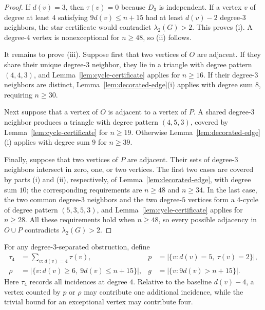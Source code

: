 \documentclass[11pt]{article}
\numberwithin{equation}{section}
\theoremstyle{definition}
\theoremstyle{remark}
\newcommand{\ac}{\lambda_2}
\begin{document}
\begin{proof}
If \(d(v)=3\), then \(\tau(v)=0\) because \(D_3\) is independent.  If a
vertex \(v\) of degree at least \(4\) satisfying \(9d(v)\le n+15\) had
at least \(d(v)-2\) degree-\(3\) neighbors, the star certificate would
contradict \(\ac(G)>2\).  This proves (i).  A degree-\(4\) vertex is
nonexceptional for \(n\ge48\), so (ii) follows.

It remains to prove (iii).  Suppose first that two vertices of \(O\) are
adjacent.  If they share their unique degree-\(3\) neighbor, they lie in a
triangle with degree pattern \((4,4,3)\), and
Lemma~\ref{lem:cycle-certificate} applies for \(n\ge16\).  If their degree-\(3\)
neighbors are distinct, Lemma~\ref{lem:decorated-edge}(i) applies with
degree sum \(8\), requiring \(n\ge30\).

Next suppose that a vertex of \(O\) is adjacent to a vertex of \(P\).
A shared degree-\(3\) neighbor produces a triangle with degree pattern
\((4,5,3)\), covered by Lemma~\ref{lem:cycle-certificate} for \(n\ge19\).
Otherwise Lemma~\ref{lem:decorated-edge}(i) applies with degree sum \(9\)
for \(n\ge39\).

Finally, suppose that two vertices of \(P\) are adjacent.  Their sets of
degree-\(3\) neighbors intersect in zero, one, or two vertices.  The first
two cases are covered by parts (i) and (ii), respectively, of
Lemma~\ref{lem:decorated-edge}, with degree sum \(10\); the corresponding
requirements are \(n\ge48\) and \(n\ge34\).  In the last case,
the two common degree-\(3\) neighbors and the two degree-\(5\) vertices
form a \(4\)-cycle of degree pattern \((5,3,5,3)\), and
Lemma~\ref{lem:cycle-certificate} applies for \(n\ge28\).  All these
requirements hold when \(n\ge48\), so every possible adjacency in
\(O\cup P\) contradicts \(\ac(G)>2\).
\end{proof}

For any degree-\(3\)-separated obstruction, define
\begin{align*}
  \tau_4&=\sum_{v:\,d(v)=4}\tau(v),&
  p&=\bigl|\{v:d(v)=5,\ \tau(v)=2\}\bigr|,\\
  \rho&=\bigl|\{v:d(v)\ge6,\ 9d(v)\le n+15\}\bigr|,&
  g&=\bigl|\{v:9d(v)>n+15\}\bigr|.
\end{align*}
Here \(\tau_4\) records all incidences at degree \(4\).  Relative to the
baseline \(d(v)-4\), a vertex counted by \(p\) or \(\rho\) may contribute
one additional incidence, while the trivial bound for an exceptional
vertex may contribute four.
\end{document}
